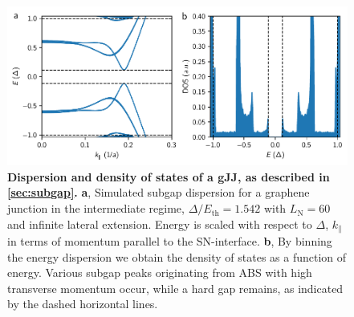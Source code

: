 \begin{figure}[]
	\centering
	\includegraphics[width=\linewidth]{chapter-gJJ/figs/si_subgap_dos}
	\caption{{\bf Dispersion and density of states of a gJJ, as described in \ref{sec:subgap}.}
		{\bf a}, Simulated subgap dispersion for a graphene junction in the intermediate regime, $\Delta/E_\text{th}=1.542$ with $L_\text{N}=60$ and infinite lateral extension.
		Energy is scaled with respect to $\Delta$, $k_\parallel$ in terms of momentum parallel to the SN-interface.
		{\bf b}, By binning the energy dispersion we obtain the density of states as a function of energy.
		Various subgap peaks originating from ABS with high transverse momentum occur, while a hard gap remains, as indicated by the dashed horizontal lines.
	}
	\label{gJJfig:subgap_dos}
\end{figure}


